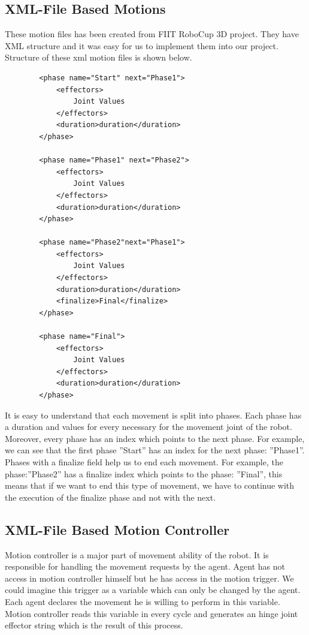 \subsection{XML-File Based Motions}
These motion files has been created from FIIT RoboCup 3D project. They have XML structure and it was easy for us to implement them into our project. Structure of these xml motion files is shown below.
\begin{verbatim}
		<phase name="Start" next="Phase1">
			<effectors>
				Joint Values
			</effectors>
			<duration>duration</duration>
		</phase>
		
		<phase name="Phase1" next="Phase2">
			<effectors>
				Joint Values
			</effectors>
			<duration>duration</duration>
		</phase>
		
		<phase name="Phase2"next="Phase1">
			<effectors>
				Joint Values
			</effectors>
			<duration>duration</duration>
			<finalize>Final</finalize>
		</phase>
		
		<phase name="Final">
			<effectors>
				Joint Values
			</effectors>
			<duration>duration</duration>
		</phase>
\end{verbatim}
It is easy to understand that each movement is split into phases. Each phase has a duration and values for every necessary for the movement joint of the robot. Moreover, every phase has an index which points to the next phase. For example, we can see that the first phase ''Start'' has an index for the next phase: ''Phase1''. Phases with a finalize field help us to end each movement. For example, the phase:''Phase2'' has a finalize index which points to the phase: ''Final'', this means that if we want to end this type of movement, we have to continue with the execution of the finalize phase and not with the next.
\subsection{XML-File Based Motion Controller}
Motion controller is a major part of movement ability of the robot. It is responsible for handling the movement requests by the agent. Agent has not access in motion controller himself but he has access in the motion trigger. We could imagine this trigger as a variable which can only be changed by the agent. Each agent declares the movement he is willing to perform in this variable.
Motion controller reads this variable in every cycle and generates an hinge joint effector string which is the result of this process.


